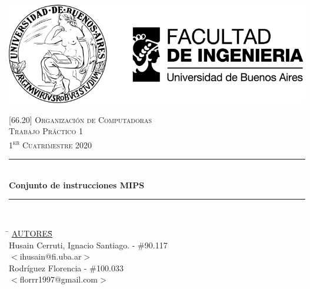 \documentclass[a4paper,12pt]{article}
\numberwithin{equation}{section}
\numberwithin{figure}{section}
\begin{document}
	\pagestyle{fancy}
	\begin{titlepage}
		\newcommand{\HRule}{\rule{\linewidth}{0.5mm}} %
		\center %
		
		\thispagestyle{empty}
		\begin{center}
			\includegraphics[scale=1]{includes/banner_fiuba.pdf}\\
		\end{center}
		
		
		\textsc{\LARGE \textsc{[66.20] Organización de Computadoras}}\\[0.5cm]
		\textsc{\Large \textsc{Trabajo Práctico 1}}\\[0.5cm]
		\textsc{\large 1\textsuperscript{er} Cuatrimestre 2020}\\[0.25cm]
		
		\HRule\\[0.5cm]
		{\huge\bfseries Conjunto de instrucciones MIPS}\\[0.2cm]
		\HRule\\[0.5cm]
		
		\begin{tabbing}
			\hspace{2cm}\=\+
			\underline{AUTORES}\hspace{-1cm}\=\+\hspace{1cm}\=\hspace{6cm}\=\\[0.2cm]
			
			Husain Cerruti, Ignacio Santiago.	\>\>- \#90.117\\
			\>\footnotesize{$<$ihusain@fi.uba.ar$>$}\\
			
			Rodríguez Florencia	\>\>- \#100.033\\
			\>\footnotesize{$<$florrr1997@gmail.com$>$}\\
			

\end{tabbing}
\end{titlepage}
\end{document}
